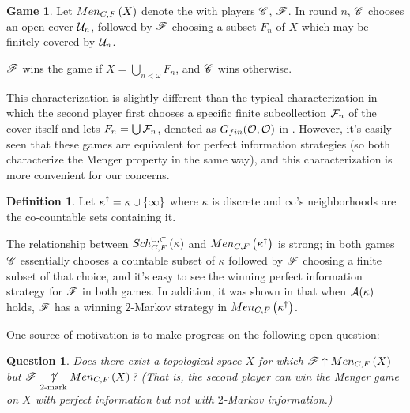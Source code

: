 \documentclass{amsart}
\theoremstyle{plain}
\newtheorem{question}[theorem]{Question}
\theoremstyle{definition}
\newtheorem{definition}[theorem]{Definition}
\newtheorem{game}[theorem]{Game}
\theoremstyle{remark}
\theoremstyle{plain}
\theoremstyle{definition}
\theoremstyle{remark}
\begin{document}
  \begin{game}
    Let \(Men_{C,F}\left({X}\right)\) denote the  with players \(\mathscr{C}\),
    \(\mathscr{F}\).
    In round \(n\), \(\mathscr{C}\) chooses an open cover \(\mathcal{U}_n\), followed by
    \(\mathscr{F}\) choosing a
    subset \(F_n\) of \(X\) which may be finitely covered by \(\mathcal{U}_n\).

    \(\mathscr{F}\) wins the game if \(X = \bigcup_{n<\omega}F_n\),
    and \(\mathscr{C}\) wins otherwise.
  \end{game}

  This characterization is slightly different than the typical characterization
  in which the second player first chooses a specific
  finite subcollection \(\mathcal{F}_n\) of the cover itself and lets
  \(F_n=\bigcup \mathcal{F}_n\), denoted as \(G_{fin}(\mathcal{O},\mathcal{O})\)
  in \cite{MR1378387}.
  However, it's easily seen that these games are equivalent
  for perfect information strategies (so both characterize
  the Menger property in the same way), and this characterization is
  more convenient for our concerns.

  \begin{definition}
    Let \(\kappa^\dagger=\kappa\cup\{\infty\}\) where \(\kappa\) is
    discrete and \(\infty\)'s neighborhoods are the co-countable sets
    containing it.
  \end{definition}

  The relationship between \(Sch^{\cup,\subset}_{C,F}\left({\kappa}\right)\) and
  \(Men_{C,F}\left({\kappa^\dagger}\right)\) is strong; in both games \(\mathscr{C}\) essentially
  chooses a countable subset of \(\kappa\) followed by \(\mathscr{F}\) choosing
  a finite subset of that choice, and it's easy to see the winning perfect
  information strategy for \(\mathscr{F}\) in both games.
  In addition, it was shown in
  \cite{clontzMengerGamePreprint} that when \(\mathcal{A}(\kappa)\) holds,
  \(\mathscr{F}\) has a winning \(2\)-Markov strategy in
  \(Men_{C,F}\left({\kappa^\dagger}\right)\).

  One source of motivation is to make progress on the following open question:

  \begin{question}\label{mainQuestion}
    Does there exist a topological space \(X\) for which
    \(\mathscr{F}\uparrow Men_{C,F}\left({X}\right)\) but \(\mathscr{F}\underset{2\text{-mark}}{\not\uparrow}Men_{C,F}\left({X}\right)\)?
    (That is, the second player can win the Menger game on \(X\)
    with perfect information but not with \(2\)-Markov information.)
  \end{question}
\end{document}
